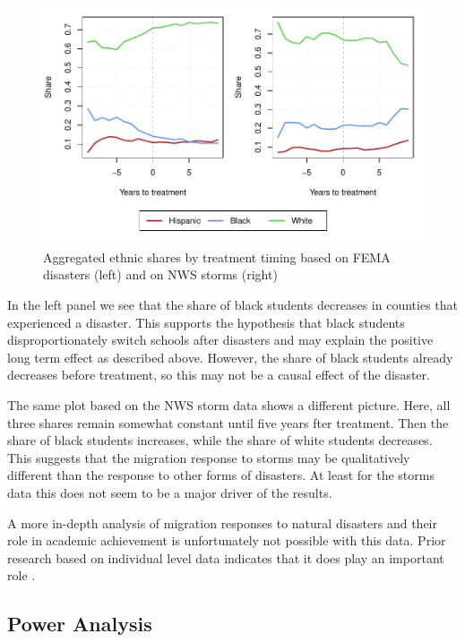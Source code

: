 \begin{figure}[!h]
	\centering
	\includegraphics[scale=1]{"../Code & Data/EthnicComposition.pdf"}
	\caption{Aggregated ethnic shares by treatment timing based on FEMA disasters (left) and on NWS storms (right)}
	\label{EthnicComposition}
\end{figure}

In the left panel we see that the share of black students decreases in counties that experienced a disaster. This supports the hypothesis that black students disproportionately switch schools after disasters and may explain the positive long term effect as described above. However, the share of black students already decreases before treatment, so this may not be a causal effect of the disaster.

The same plot based on the NWS storm data shows a different picture. Here, all three shares remain somewhat constant until five years fter treatment. Then the share of black students increases, while the share of white students decreases. This suggests that the migration response to storms may be qualitatively different than the response to other forms of disasters. At least for the storms data this does not seem to be a major driver of the results.

A more in-depth analysis of migration responses to natural disasters and their role in academic achievement is unfortunately not possible with this data. Prior research based on individual level data indicates that it does play an important role \citep[for example][]{Sacerdote_2012}.


\subsection{Power Analysis}

